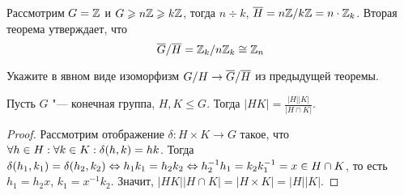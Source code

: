 \begin{example}
	Рассмотрим $G = \mathbb{Z}$ и $G \geqslant n\mathbb{Z} \geqslant k\mathbb{Z}$, тогда $n \div k$, $\overline{H} = n\mathbb{Z} / k\mathbb{Z} = n \cdot \mathbb{Z}_k$. Вторая теорема утверждает, что
	\[
		\overline{G} / \overline{H} = \mathbb{Z}_k / n\mathbb{Z}_k \cong \mathbb{Z}_n
	\]
\end{example}

\begin{exercise}
	Укажите в явном виде изоморфизм $G / H \hm\to \ol{G} / \ol{H}$ из предыдущей теоремы.
\end{exercise}

\begin{proposition}
	Пусть $G$ "--- конечная группа, $H, K \le G$. Тогда $|HK| = \frac{|H||K|}{|H\cap K|}$.
\end{proposition}

\begin{proof}
	Рассмотрим отображение $\delta: H\times K \to G$ такое, что $\forall h \hm\in H: \forall k \in K: \delta(h, k) = hk$. Тогда $\delta(h_1, k_1) = \delta(h_2, k_2) \hm\Leftrightarrow h_1k_1 = h_2k_2 \hm\Leftrightarrow h_2^{-1}h_1 = k_2k_1^{-1} = x \in H \cap K$, то есть $h_1 = h_2x$, $k_1 = x^{-1}k_2$. Значит, $|HK||H \cap K| = |H \times K| = |H||K|$.
\end{proof}